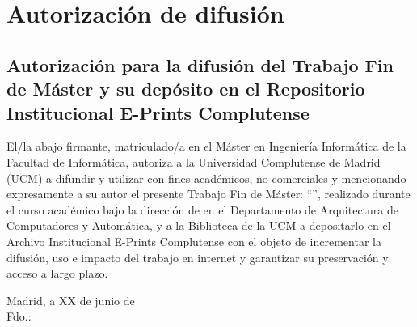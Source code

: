 \chapter*{Autorización de difusión}
\section*{Autorización para la difusión del Trabajo Fin de Máster y su depósito en el Repositorio Institucional E-Prints Complutense}
{
\setlength{\parindent}{0cm}
El/la abajo firmante, matriculado/a en el Máster en Ingeniería Informática de la Facultad de Informática, autoriza a la Universidad Complutense de Madrid (UCM) a difundir y utilizar con fines académicos, no comerciales y mencionando expresamente a su autor el presente Trabajo Fin de Máster: ``\mytitleTFG'', realizado durante el curso académico \mycourse bajo la dirección de \myadvisor en el Departamento de Arquitectura de Computadores y Automática, y a la Biblioteca de la UCM a depositarlo en el Archivo Institucional E-Prints Complutense con el objeto de incrementar la difusión, uso e impacto del trabajo en internet y garantizar su preservación y acceso a largo plazo.

\bigskip
\bigskip
\bigskip
\bigskip
\bigskip
\bigskip
\bigskip
\bigskip

\hfill Madrid, a XX de junio de \myyear\\[1.5cm]

\hfill Fdo.: \myauthor
}
